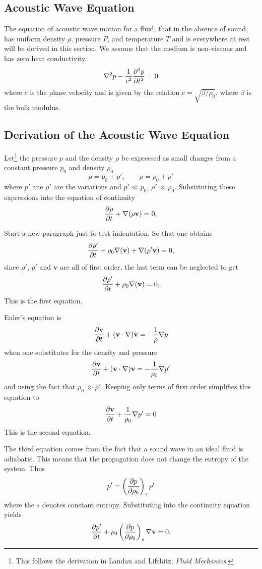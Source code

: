 \documentclass{article}
\begin{document}
\subsection{Acoustic Wave Equation}

The equation of acoustic wave motion for a fluid, that in the absence of sound,
has uniform density $\rho$, pressure $P$, and temperature $T$ and is everywhere
at rest will be derived in this section.  We assume that the medium is non-viscous
and has zero heat conductivity.  
$$
\nabla^2p-\frac{1}{c^2} {\partial^2 p \over \partial t^2} = 0
\label{eqn:lineareuler}
$$
where $c$ is the phase velocity and is given by the relation $c= \sqrt{\beta/\rho_0}$, where $\beta$ is the
bulk modulus.

\subsection{Derivation of the Acoustic Wave Equation}

Let\footnote{This follows the derivation in Landau and Lifshitz, \textit{Fluid Mechanics}.}
the pressure $p$ and the density $\rho$ be expressed as small changes
from a constant pressure $p_0$ and density $\rho_0$
$$
p = p_0 + p', \qquad \rho = \rho_0 + \rho'
$$
where $p'$ ane $\rho'$ are the variations and $p'\ll p_0$, $\rho'\ll\rho_0$.
Substituting these expressions into the equation of continuity
$$
{\partial \rho\over\partial t} + \nabla(\rho \mathbf{v}) = 0,
$$

Start a new paragraph just to test indentation.  So that one obtains
$$
{\partial \rho'\over\partial t} + \rho_0\nabla(\mathbf{v}) + \nabla(\rho'\mathbf{v}) = 0,
$$
since $\rho'$, $p'$ and $\mathbf{v}$ are all of first order, the last term can
be neglected to get
$$
{\partial \rho'\over\partial t} + \rho_0\nabla(\mathbf{v}) = 0,
$$
This is the first equation.

Euler's equation is
$$
{\partial\mathbf{v}\over\partial t} + (\mathbf{v} \cdot \nabla)\mathbf{v} = -{1\over\rho} \nabla p
$$
when one substitutes for the density and pressure
$$
{\partial\mathbf{v}\over\partial t} + (\mathbf{v} \cdot \nabla)\mathbf{v} = -{1\over\rho_0} \nabla p'
$$
and using the fact that $\rho_0\gg\rho'$.  Keeping only terms of first order
simplifies this equation to
$$
{\partial\mathbf{v}\over\partial t} + {1\over\rho_0} \nabla p'=0
$$
This is the second equation.

The third equation comes from the fact that a sound wave in an ideal
fluid is adiabatic.  This means that the propagation does not change
the entropy of the system.  Thus
$$
p' = \left({\partial p \over \partial \rho_0}\right)_s  \rho'
$$
where the $s$ denotes constant entropy.  Substituting into the continuity equation yields
$$
{\partial p'\over\partial t} + \rho_0\left({\partial p\over \partial \rho_0}\right)_s\nabla\mathbf{v} = 0,
$$
\end{document}
